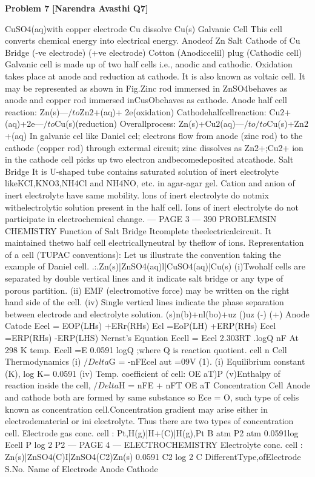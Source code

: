 \begin{problembox}
\textbf{Problem 7} \hfill \textbf{[Narendra Avasthi Q7]}
\label{q:ext-narendra_avasthi_all_questions-7}

CuSO4(aq)with copper electrode
Cu dissolve
Cu(s)
Galvanic Cell
This cell converts chemical energy into electrical energy.
Anodeof Zn
Salt
Cathode of Cu
Bridge
(-ve electrode)
(+ve electrode)
Cotton
(Anodiccelil)
plug
(Cathodic cell)
Galvanic cell is made up of two half cells i.e., anodic and cathodic. Oxidation takes place at
anode and reduction at cathode. It is also known as voltaic cell. It may be represented as shown in
Fig.Zinc rod immersed in ZnSO4behaves as anode and copper rod immersed inCusObehaves as
cathode.
Anode half cell reaction:
Zn(s)---$/to$Zn$2$+(aq)+ 2e(oxidation)
Cathodehalfcellreaction:
Cu$2$+(aq)+2e---$/to$Cu(s)(reduction)
Overallprocess:
Zn(s)+Cu$2$(aq)---$/to$$/to$Cu(s)+Zn$2$+(aq)
In galvanic cel like Daniel cel; electrons flow from anode (zinc rod) to the cathode (copper
rod) through extermal circuit; zinc dissolves as Zn2+;Cu2+ ion in the cathode cell picks up two
electron andbecomedeposited atcathode.
Salt Bridge
It is U-shaped tube contains saturated solution of inert electrolyte likeKCI,KNO3,NH4Cl and
NH4NO, etc. in agar-agar gel.
Cation and anion of inert electrolyte have same mobility.
lons of inert electrolyte do notmix withelectrolytic solution present in the half cell.
Ions of inert electrolyte do not participate in electrochemical change.
--- PAGE 3 ---
390
PROBLEMSIN CHEMISTRY
Function of Salt Bridge
Itcomplete theelectricalcircuit.
It maintained thetwo half cell electricallyneutral by theflow of ions.
Representation of a cell (TUPAC conventions): Let us illustrate the convention taking
the example of Daniel cell.
.:.Zn(s)|ZnSO4(aq)l|CuSO4(aq)|Cu(s)
(i)Twohalf cells are separated by double vertical lines and it indicate salt bridge or any type
of porous partition.
(ii) EMF (electromotive force) may be written on the right hand side of the cell.
(iv) Single vertical lines indicate the phase separation between electrode and electrolyte
solution.
(s)n(b)+nl(bo)+uz ()uz
(-)
(+)
Anode
Catode
Eeel = EOP(LHs) +ERr(RHs) Ecl =EoP(LH) +ERP(RHs) Ecel =ERP(RHs) -ERP(LHS)
Nernst's Equation
Ecell = Ecel
2.303RT
.logQ
nF
At 298 K temp.
Ecell =E
0.0591
logQ ;where Q is reaction quotient.
cell
n
Cell Thermodynamics
(i) $/Delta$G = -nFEcel
aut =09V (1).
(i) Equilibrium constant (K), log K=
0.0591
(iv) Temp. coefficient of cell: 
OE
aT)P
(v)Enthalpy of reaction inside the cell, $/Delta$H = nFE + nFT
OE
aT
Concentration Cell
Anode and cathode both are formed by same substance so Ece = O, such type of celis known as
concentration cell.Concentration gradient may arise either in electrodematerial or ini electrolyte.
Thus there are two types of concentration cell.
Electrode gas conc. cell :
Pt,H(g)|H+(C)|H(g),Pt
B atm
P2 atm
0.0591log
Ecell
P
log
2
P2
--- PAGE 4 ---
ELECTROCHEMISTRY
Electrolyte conc. cell :
Zn(s)|ZnSO4(C)I|ZnSO4(C2)Zn(s)
0.0591
C2
log
2
C
DifferentType,ofElectrode
S.No.
Name of Electrode
Anode
Cathode
\end{problembox}

